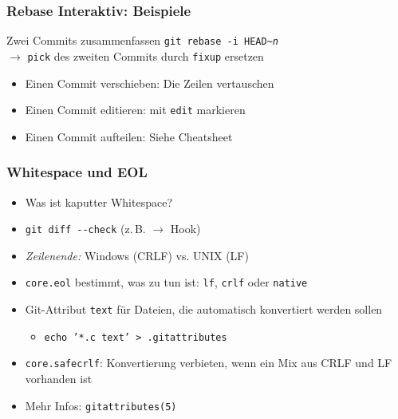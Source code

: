 \documentclass{beamer}
\begin{document}
\begin{frame}
 \frametitle{Rebase Interaktiv: Beispiele}



\begin{block}{Zwei Commits zusammenfassen}
\texttt{git rebase -i HEAD\textasciitilde{}\emph{n}}\\
$\rightarrow$ \texttt{pick} des zweiten Commits durch \texttt{fixup} ersetzen
\end{block}

\begin{itemize}
	\item Einen Commit verschieben: Die Zeilen vertauschen
	\item Einen Commit editieren: mit \texttt{edit} markieren
	\item Einen Commit aufteilen: Siehe Cheatsheet
\end{itemize}
 \end{frame}

\begin{frame}
 \frametitle{Whitespace und EOL}

\begin{itemize}
	\item Was ist kaputter Whitespace?
	\item \texttt{git diff -{}-check} (z.\,B. $\rightarrow$ Hook)
\end{itemize}

\begin{itemize}
	\item \emph{Zeilenende:} Windows (CRLF) vs. UNIX (LF)
	\item \texttt{core.eol} bestimmt, was zu tun ist: \texttt{lf}, \texttt{crlf} oder \texttt{native}
	\item Git-Attribut \texttt{text} für Dateien, die automatisch konvertiert werden sollen
\begin{itemize}
	\item \texttt{echo '*.c text' > .gitattributes}
\end{itemize}
	\item \texttt{core.safecrlf}: Konvertierung verbieten, wenn ein Mix aus CRLF und LF vorhanden ist
	\item Mehr Infos: \texttt{gitattributes(5)}
\end{itemize}
 \end{frame}
\end{document}
